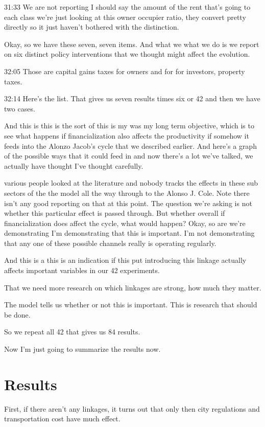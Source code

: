 31:33
We are not reporting I should say the amount of the rent that's going to each class we're just looking at this owner occupier ratio, they convert pretty directly so it just haven't bothered with the distinction.

Okay, so we have these seven, seven items. And what we what we do is we report on six distinct policy interventions that we thought might affect the evolution.

32:05
Those are capital gains taxes for owners and for for investors, property taxes.

32:14
Here's the list.
That gives us seven results times six or 42 and then we have two cases. 

And this is this is the sort of this is my was my long term objective, which is to see what happens if financialization also affects the productivity if somehow it feeds into the Alonzo Jacob's cycle that we described earlier. And here's a graph of the possible ways that it could feed in and now there's a lot we've talked, we actually have thought I've thought carefully. 

various people looked at the literature and nobody tracks the effects in these sub sectors of the the model all the way through to the Alonso J. Cole. Note there isn't any good reporting on that at this point. The question we're asking is not whether this particular effect is passed through. But whether overall if financialization does affect the cycle, what would happen? Okay, so are we're demonstrating I'm demonstrating that this is important. I'm not demonstrating that any one of these possible channels really is operating regularly.

And this is a this is an indication if this put introducing this linkage actually affects important variables in our 42 experiments.

That we need more research on which linkages are strong, how much they matter.

The model tells us whether or not this is important. This is research that should be done.

So we repeat all 42 that gives us 84 results.

Now I'm just going to summarize the results now.

\section{Results}

First, if there aren't any linkages, it turns out that only then city regulations and transportation cost have much effect.

